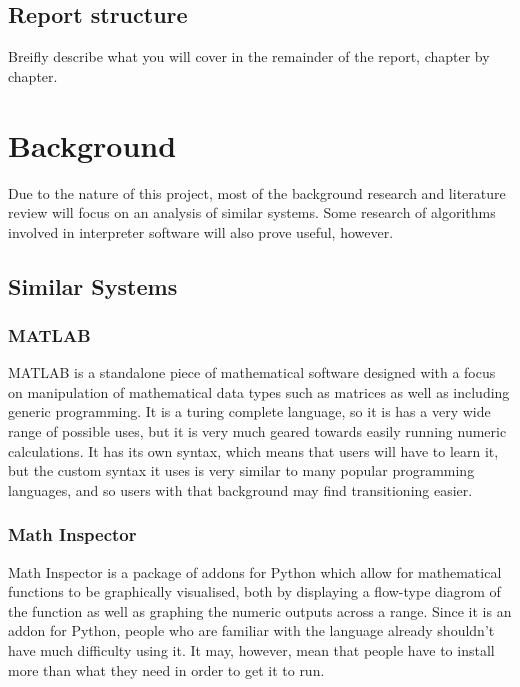 \documentclass[a4paper, oneside, 11pt]{report}
\begin{document}
\section{Report structure}
Breifly describe what you will cover in the remainder of the report, chapter by chapter.

\chapter{Background}

Due to the nature of this project, most of the background research and literature review will focus on an analysis of similar systems. Some research of algorithms involved in 
interpreter software will also prove useful, however.

\section{Similar Systems}

\subsection{MATLAB\cite{MATLAB}}

MATLAB is a standalone piece of mathematical software designed with a focus on manipulation of mathematical data types such as matrices as well as including generic programming. 
It is a turing complete language, so it is has a very wide range of possible uses, but it is very much geared towards easily running numeric calculations. It has its own syntax,
which means that users will have to learn it, but the custom syntax it uses is very similar to many popular programming languages, and so users with that background may find transitioning easier.

\subsection{Math Inspector\cite{Math_Inspector}}

Math Inspector is a package of addons for Python which allow for mathematical functions to be graphically visualised, both by displaying a flow-type diagrom of the function as well as graphing the numeric outputs across a range.
 Since it is an addon for Python, people who are familiar with the language already shouldn't have much difficulty using it. It may, however, mean that people have to install more than what they need in order to get it to run.
\end{document}
